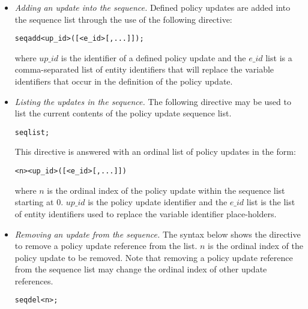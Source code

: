\documentclass[global,twocolumn,draft]{svjour}
\newenvironment{vverbatim}
  {\begin{alltt}}
  {\vspace{-\baselineskip}\end{alltt}}
\begin{document}
        \begin{itemize}
          \item
            {\em Adding an update into the sequence.}
            Defined policy updates are added into the sequence list through the
            use of the following directive:

            \begin{vverbatim}
  seq add <up\_id>([<e\_id>[, ...]]);
            \end{vverbatim}

            \noindent where $up\_id$ is the identifier of a defined policy
            update and the $e\_id$ list is a comma-separated list of entity
            identifiers that will replace the variable identifiers that occur in
            the definition of the policy update.

          \item
            {\em Listing the updates in the sequence.}
            The following directive may be used to list the current contents of
            the policy update sequence list.

            \begin{vverbatim}
  seq list;
            \end{vverbatim}

            This directive is answered with an ordinal list of policy updates
            in the form:

            \begin{vverbatim}
  <n> <up\_id>([<e\_id>[, ...]])
            \end{vverbatim}

            \noindent where $n$ is the ordinal index of the policy update
            within the sequence list starting at 0. $up\_id$ is the policy
            update identifier and the $e\_id$ list is the list of entity
            identifiers used to replace the variable identifier place-holders.

          \item
            {\em Removing an update from the sequence.}
            The syntax below shows the directive to remove a policy update
            reference from the list. $n$ is the ordinal index of the policy
            update to be removed. Note that removing a policy update reference
            from the sequence list may change the ordinal index of other update
            references.

            \begin{vverbatim}
  seq del <n>;
            \end{vverbatim}


\end{itemize}
\end{document}
